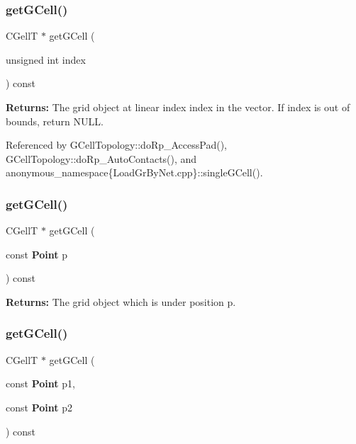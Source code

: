 \subsubsection{\texorpdfstring{get\+G\+Cell()}{getGCell()}\hspace{0.1cm}{\footnotesize\ttfamily [1/3]}}
{\footnotesize\ttfamily C\+GellT $\ast$ get\+G\+Cell (\begin{DoxyParamCaption}\item[{unsigned int}]{index }\end{DoxyParamCaption}) const\hspace{0.3cm}{\ttfamily [inline]}}

{\bfseries Returns\+:} The grid object at linear index {\ttfamily index} in the vector. If {\ttfamily index} is out of bounds, return {\ttfamily N\+U\+LL}. 

Referenced by G\+Cell\+Topology\+::do\+Rp\+\_\+\+Access\+Pad(), G\+Cell\+Topology\+::do\+Rp\+\_\+\+Auto\+Contacts(), and anonymous\+\_\+namespace\{\+Load\+Gr\+By\+Net.\+cpp\}\+::single\+G\+Cell().

\mbox{\label{classKatabatic_1_1Grid_a0ee3cd2fb8c66458b0d00e39826921da}} 
\subsubsection{\texorpdfstring{get\+G\+Cell()}{getGCell()}\hspace{0.1cm}{\footnotesize\ttfamily [2/3]}}
{\footnotesize\ttfamily C\+GellT $\ast$ get\+G\+Cell (\begin{DoxyParamCaption}\item[{const \textbf{ Point}}]{p }\end{DoxyParamCaption}) const\hspace{0.3cm}{\ttfamily [inline]}}

{\bfseries Returns\+:} The grid object which is under position {\ttfamily p}. \mbox{\label{classKatabatic_1_1Grid_a1beb5c490b2e651eab49178297b6cda2}} 
\subsubsection{\texorpdfstring{get\+G\+Cell()}{getGCell()}\hspace{0.1cm}{\footnotesize\ttfamily [3/3]}}
{\footnotesize\ttfamily C\+GellT $\ast$ get\+G\+Cell (\begin{DoxyParamCaption}\item[{const \textbf{ Point}}]{p1,  }\item[{const \textbf{ Point}}]{p2 }\end{DoxyParamCaption}) const\hspace{0.3cm}{\ttfamily [inline]}}

